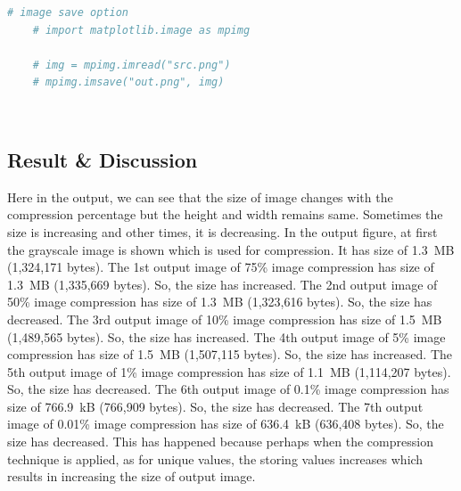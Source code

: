 \documentclass{article}
\begin{document}
{\begin{lstlisting}[language=Python, caption=Code for Image Compression on Frequency Domain]
    # image save option
    # import matplotlib.image as mpimg
    
    # img = mpimg.imread("src.png")
    # mpimg.imsave("out.png", img)

    \end{lstlisting}
    \\
    
    \subsection{Result & Discussion}
    Here in the output, we can see that the size of image changes with the compression percentage but the height and width remains same. Sometimes the size is increasing and other times, it is decreasing. In the output figure, at first the grayscale image is shown which is used for compression. It has size of 1.3 MB (1,324,171 bytes). The 1st output image of 75\% image compression has size of 1.3 MB (1,335,669 bytes). So, the size has increased. The 2nd output image of 50\% image compression has size of 1.3 MB (1,323,616 bytes). So, the size has decreased. The 3rd output image of 10\% image compression has size of 1.5 MB (1,489,565 bytes). So, the size has increased. The 4th output image of 5\% image compression has size of 1.5 MB (1,507,115 bytes). So, the size has increased. The 5th output image of 1\% image compression has size of 1.1 MB (1,114,207 bytes). So, the size has decreased. The 6th output image of 0.1\% image compression has size of 766.9 kB (766,909 bytes). So, the size has decreased. The 7th output image of 0.01\% image compression has size of 636.4 kB (636,408 bytes). So, the size has decreased. This has happened because perhaps when the compression technique is applied, as for unique values, the storing values increases which results in increasing the size of output image. 
    
}
\end{document}
